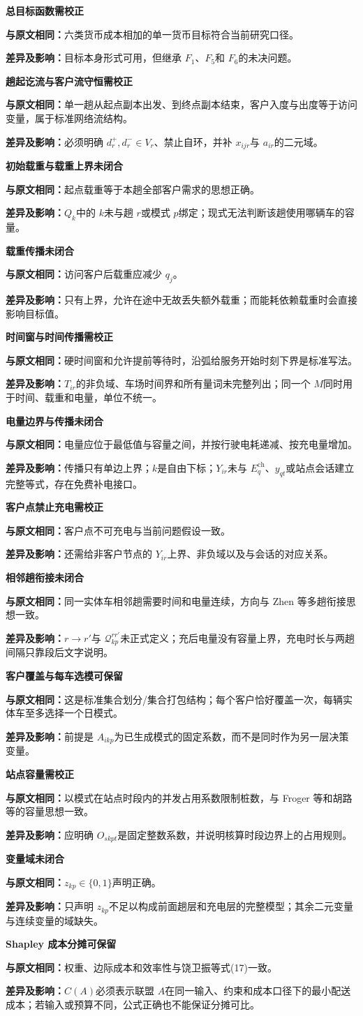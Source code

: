 \documentclass[UTF8,11pt,a4paper,fontset=none]{ctexart}
\newcommand{\pass}{\textcolor{okgreen}{\textbf{可保留}}}
\newcommand{\revise}{\textcolor{warnorange}{\textbf{需校正}}}
\newcommand{\fail}{\textcolor{badred}{\textbf{未闭合}}}
\newcommand{\audititem}[4]{%
  \noindent\textbf{#1}\hfill #2\par
  \noindent\textbf{与原文相同：}#3\par
  \noindent\textbf{差异及影响：}#4\par\medskip
}
\begin{document}
\audititem{总目标函数}{\revise}
{六类货币成本相加的单一货币目标符合当前研究口径。}
{目标本身形式可用，但继承 $F_1$、$F_5$和 $F_6$的未决问题。}

\audititem{趟起讫流与客户流守恒}{\revise}
{单一趟从起点副本出发、到终点副本结束，客户入度与出度等于访问变量，属于标准网络流结构。}
{必须明确 $d_r^+,d_r^-\in V_r$、禁止自环，并补 $x_{ijr}$与 $a_{ir}$的二元域。}

\audititem{初始载重与载重上界}{\fail}
{起点载重等于本趟全部客户需求的思想正确。}
{$Q_k$中的 $k$未与趟 $r$或模式 $p$绑定；现式无法判断该趟使用哪辆车的容量。}

\audititem{载重传播}{\fail}
{访问客户后载重应减少 $q_j$。}
{只有上界，允许在途中无故丢失额外载重；而能耗依赖载重时会直接影响目标值。}

\audititem{时间窗与时间传播}{\revise}
{硬时间窗和允许提前等待时，沿弧给服务开始时刻下界是标准写法。}
{$T_{ir}$的非负域、车场时间界和所有量词未完整列出；同一个 $M$同时用于时间、载重和电量，单位不统一。}

\audititem{电量边界与传播}{\fail}
{电量应位于最低值与容量之间，并按行驶电耗递减、按充电量增加。}
{传播只有单边上界；$k$是自由下标；$Y_{ir}$未与 $E_q^{\mathrm{ch}}$、$y_{qt}$或站点会话建立完整等式，存在免费补电接口。}

\audititem{客户点禁止充电}{\revise}
{客户点不可充电与当前问题假设一致。}
{还需给非客户节点的 $Y_{ir}$上界、非负域以及与会话的对应关系。}

\audititem{相邻趟衔接}{\fail}
{同一实体车相邻趟需要时间和电量连续，方向与 Zhen 等多趟衔接思想一致。}
{$r\to r'$与 $\mathcal Q_{kp}^{rr'}$未正式定义；充后电量没有容量上界，充电时长与两趟间隔只靠段后文字说明。}

\audititem{客户覆盖与每车选模}{\pass}
{这是标准集合划分/集合打包结构；每个客户恰好覆盖一次，每辆实体车至多选择一个日模式。}
{前提是 $A_{ikp}$为已生成模式的固定系数，而不是同时作为另一层决策变量。}

\audititem{站点容量}{\revise}
{以模式在站点时段内的并发占用系数限制桩数，与 Froger 等和胡路等的容量思想一致。}
{应明确 $O_{skpt}$是固定整数系数，并说明核算时段边界上的占用规则。}

\audititem{变量域}{\fail}
{$z_{kp}\in\{0,1\}$声明正确。}
{只声明 $z_{kp}$不足以构成前面趟层和充电层的完整模型；其余二元变量与连续变量的域缺失。}

\audititem{Shapley 成本分摊}{\pass}
{权重、边际成本和效率性与饶卫振等式(17)一致。}
{$C(A)$必须表示联盟 $A$在同一输入、约束和成本口径下的最小配送成本；若输入或预算不同，公式正确也不能保证分摊可比。}
\end{document}
